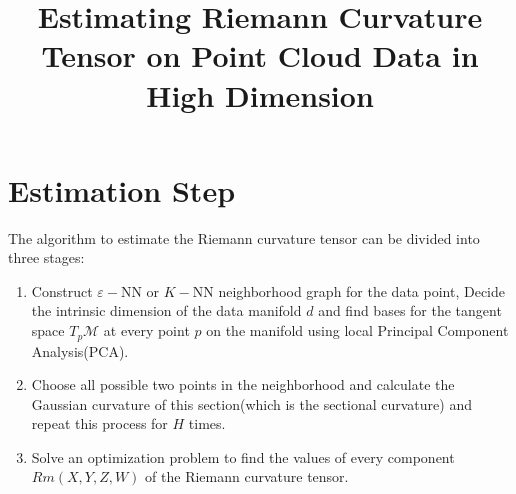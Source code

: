 \documentclass{article}
\title{Estimating Riemann Curvature Tensor on Point Cloud Data in High Dimension}
\author{}
\date{}
\begin{document}
\maketitle
\section{Estimation Step}
The algorithm to estimate the Riemann curvature tensor can be divided into three stages:
\begin{enumerate}
	\item Construct $\varepsilon-$NN or $K-$NN neighborhood graph for the data point, Decide the intrinsic dimension of the data manifold $d$ and find bases for the tangent space $T_p\mathcal{M}$ at every point $p$ on the manifold using local Principal Component Analysis(PCA). 
	\item Choose all possible two points in the neighborhood and calculate the Gaussian curvature of this section(which is the sectional curvature) and repeat this process for $H$ times.
	\item Solve an optimization problem to find the values of every component $Rm(X,Y,Z,W)$ of the Riemann curvature tensor.
\end{enumerate}
\end{document}
